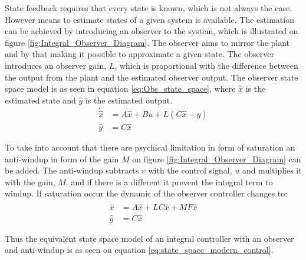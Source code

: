 \documentclass[../../main.tex]{subfiles}
\begin{document}
State feedback requires that every state is known, which is not always the case. However means to estimate states of a given system is available. The estimation can be achieved by introducing an observer to the system, which is illustrated on figure \ref{fig:Integral_Observer_Diagram}. The observer aims to mirror the plant and by that making it possible to approximate a given state.
The observer introduces an observer gain, $L$, which is proportional with the difference between the output from the plant and the estimated observer output. The observer state space model is as seen in equation \ref{eq:Obs_state_space}, where $\hat{x}$ is the estimated state and $\hat{y}$ is the estimated output.
\begin{equation}\label{eq:Obs_state_space}
    \begin{split}
        \Dot{\hat{x}}&=A\hat{x}+Bu+L(C\hat{x}-y)\\
        \hat{y}&=C\hat{x}
    \end{split}
\end{equation}

To take into account that there are psychical limitation in form of saturation an anti-windup in form of the gain $M$ on figure \ref{fig:Integral_Observer_Diagram} can be added. The anti-windup subtracts $v$ with the control signal, $u$ and multiplies it with the gain, $M$. and if there is a different it prevent the integral term to windup. 
If saturation occur the dynamic of the observer controller changes to:
\begin{equation}\label{eq:anti-windup_state_space}
    \begin{split}
        \Dot{\hat{x}}&=A\hat{x}+LC\hat{x}+MF\hat{x}\\
        \hat{y}&=C\hat{x}
    \end{split}
\end{equation}

Thus the equivalent state space model of an integral controller with an observer and anti-windup is as seen on equation \ref{eq:state_space_modern_control}.
\end{document}
